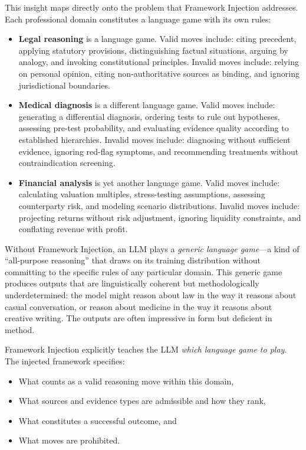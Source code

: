 \documentclass[12pt,a4paper]{article}
\begin{document}
This insight maps directly onto the problem that Framework Injection addresses. Each professional domain constitutes a language game with its own rules:

\begin{itemize}
    \item \textbf{Legal reasoning} is a language game. Valid moves include: citing precedent, applying statutory provisions, distinguishing factual situations, arguing by analogy, and invoking constitutional principles. Invalid moves include: relying on personal opinion, citing non-authoritative sources as binding, and ignoring jurisdictional boundaries.

    \item \textbf{Medical diagnosis} is a different language game. Valid moves include: generating a differential diagnosis, ordering tests to rule out hypotheses, assessing pre-test probability, and evaluating evidence quality according to established hierarchies. Invalid moves include: diagnosing without sufficient evidence, ignoring red-flag symptoms, and recommending treatments without contraindication screening.

    \item \textbf{Financial analysis} is yet another language game. Valid moves include: calculating valuation multiples, stress-testing assumptions, assessing counterparty risk, and modeling scenario distributions. Invalid moves include: projecting returns without risk adjustment, ignoring liquidity constraints, and conflating revenue with profit.
\end{itemize}

Without Framework Injection, an LLM plays a \emph{generic language game}---a kind of ``all-purpose reasoning'' that draws on its training distribution without committing to the specific rules of any particular domain. This generic game produces outputs that are linguistically coherent but methodologically underdetermined: the model might reason about law in the way it reasons about casual conversation, or reason about medicine in the way it reasons about creative writing. The outputs are often impressive in form but deficient in method.

Framework Injection explicitly teaches the LLM \emph{which language game to play}. The injected framework specifies:
\begin{itemize}
    \item What counts as a valid reasoning move within this domain,
    \item What sources and evidence types are admissible and how they rank,
    \item What constitutes a successful outcome, and
    \item What moves are prohibited.
\end{itemize}
\end{document}
